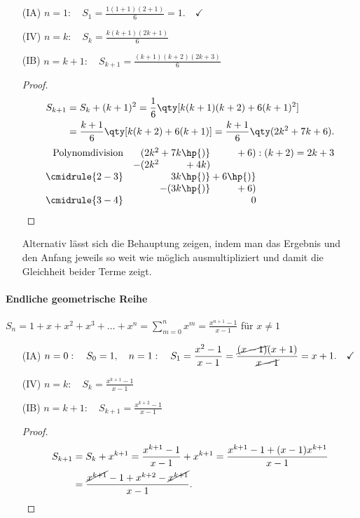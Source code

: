 \begin{enumerate}
    \item[(IA)] $\displaystyle n=1: \quad S_1 = \frac{1(1+1)(2+1)}{6} = 1 .\quad\checkmark$ 
    \item[(IV)] $\displaystyle n=k: \quad S_k = \frac{k(k+1)(2k+1)}{6}$
    \item[(IB)] $\displaystyle n=k+1:\quad S_{k+1} = \frac{(k+1)(k+2)(2k+3)}{6}$
    \begin{proof}$~$\\[-1.5cm]
        \begin{align}
            S_{k+1} &= S_k + (k+1)^2 = \frac{1}{6}\qty[k(k+1)(k+2)+6(k+1)^2] \notag \\
            &= \frac{k+1}{6}\qty[k(k+2)+6(k+1)] = \frac{k+1}{6}\qty(2k^2+7k+6).
        \end{align}
        \begin{align}
            \begin{array}{r r@{} r@{}  r@{} r}
                \text{Polynomdivision}&(2k^2 &{}+7k\hp{)}&{}+6) &\;:(k+2) = 2k+3 \\
              &-(2k^2 &{}+4k) \\ 
              \cmidrule{2-3}
                    & & 3k \hp{)} &{}+6\hp{)}\\
                    & &-(3k\hp{)}&{}+6) \\
              \cmidrule{3-4}
                    & & & 0
            \end{array}
        \end{align}
    \end{proof}
    Alternativ lässt sich die Behauptung zeigen, indem man das Ergebnis und den Anfang jeweils so weit wie möglich ausmultipliziert und damit die Gleichheit beider Terme zeigt.
\end{enumerate}

\paragraph{Endliche geometrische Reihe} $S_n = 1+ x+x^2+ x^3+ \hdots + x^n =\sum_{m=0}^n x^m = \frac{x^{n+1}-1}{x-1}$ für $x\neq 1$ 

\begin{enumerate}
    \item[(IA)] $\displaystyle n=0: \quad S_0 = 1, \quad n=1: \quad S_1 = \frac{x^2 -1}{x-1} = \frac{\cancel{(x-1)}(x+1)}{\cancel{x-1}} = x+1 .\quad\checkmark$ 
    \item[(IV)] $\displaystyle n=k: \quad S_k = \frac{x^{k+1}-1}{x-1}$
    \item[(IB)] $\displaystyle n=k+1:\quad S_{k+1} = \frac{x^{k+2}-1}{x-1}$
    \begin{proof}$~$\\[-1.5cm]
        \begin{align}
            S_{k+1} &= S_k + x^{k+1} = \frac{x^{k+1}-1}{x-1} + x^{k+1} = \frac{x^{k+1}-1 + (x-1)x^{k+1}}{x-1} \notag \\
            &= \frac{\cancel{x^{k+1}}-1 + x^{k+2}-\cancel{x^{k+1}}}{x-1}.
        \end{align}
    \end{proof}
\end{enumerate}

